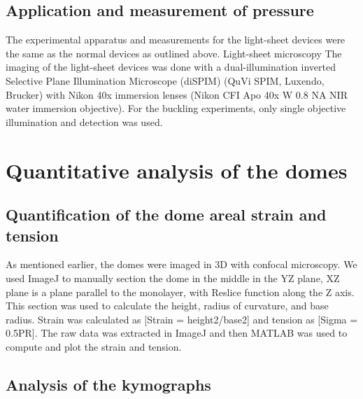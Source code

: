 \hypertarget{application-and-measurement-of-pressure}{%
	\subsection{Application and measurement of
		pressure}\label{application-and-measurement-of-pressure}}

The experimental apparatus and measurements for the light-sheet devices
were the same as the normal devices as outlined above. Light-sheet
microscopy The imaging of the light-sheet devices was done with a
dual-illumination inverted Selective Plane Illumination Microscope
(diSPIM) (QuVi SPIM, Luxendo, Brucker) with Nikon 40x immersion lenses
(Nikon CFI Apo 40x W 0.8 NA NIR water immersion objective). For the
buckling experiments, only single objective illumination and detection
was used.

\hypertarget{quantitative-analysis-of-the-domes}{%
	\section{Quantitative analysis of the
		domes}\label{quantitative-analysis-of-the-domes}}

\hypertarget{quantification-of-the-dome-areal-strain-and-tension}{%
	\subsection{Quantification of the dome areal strain and
		tension}\label{quantification-of-the-dome-areal-strain-and-tension}}

As mentioned earlier, the domes were imaged in 3D with confocal
microscopy. We used ImageJ to manually section the dome in the middle in
the YZ plane, XZ plane is a plane parallel to the monolayer, with
Reslice function along the Z axis. This section was used to calculate
the height, radius of curvature, and base radius. Strain was calculated
as {[}Strain = height2/base2{]} and tension as {[}Sigma = 0.5PR{]}. The
raw data was extracted in ImageJ and then MATLAB was used to compute and
plot the strain and tension.

\hypertarget{analysis-of-the-kymographs}{%
	\subsection{Analysis of the
		kymographs}\label{analysis-of-the-kymographs}}

